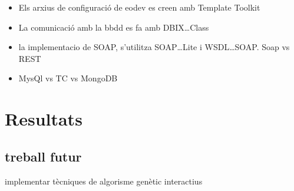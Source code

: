 \documentclass[titlepage,a4paper,12pt]{book}
\begin{document}
\begin{itemize}
	\item Els arxius de configuració de eodev es creen amb Template Toolkit
	\item La comunicació amb la bbdd es fa amb DBIX\dots Class
	\item la implementacio de SOAP, s'utilitza SOAP\dots Lite i WSDL\dots SOAP.
		Soap vs REST
	\item MysQl vs TC vs MongoDB
\end{itemize}



\section{Resultats} %
	\label{sec:Resultats}
	\subsection{treball futur} %
	\label{sub:treball futur}
	implementar tècniques de algorisme genètic  interactius
	
\end{document}
